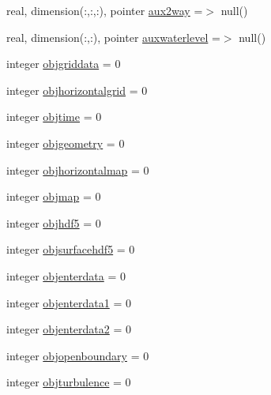 \begin{DoxyCompactItemize}
\item 
real, dimension(\+:,\+:,\+:), pointer \mbox{\hyperlink{structmodulehydrodynamic_1_1t__hydrodynamic_a261d973b7c45e59f818d8c0c96ba4cfd}{aux2way}} =$>$ null()
\item 
real, dimension(\+:,\+:), pointer \mbox{\hyperlink{structmodulehydrodynamic_1_1t__hydrodynamic_ad58ea9575b05bcac20f10f2f668dfc9a}{auxwaterlevel}} =$>$ null()
\item 
integer \mbox{\hyperlink{structmodulehydrodynamic_1_1t__hydrodynamic_a3fd670025e0afe6b14388bcb5bddb083}{objgriddata}} = 0
\item 
integer \mbox{\hyperlink{structmodulehydrodynamic_1_1t__hydrodynamic_afa271d67fc223227e43d36adda3f5a8d}{objhorizontalgrid}} = 0
\item 
integer \mbox{\hyperlink{structmodulehydrodynamic_1_1t__hydrodynamic_aac2b5de34c4ef0ddc8073d7f1b496823}{objtime}} = 0
\item 
integer \mbox{\hyperlink{structmodulehydrodynamic_1_1t__hydrodynamic_ad826fa2d6067e5aed953ed069f305183}{objgeometry}} = 0
\item 
integer \mbox{\hyperlink{structmodulehydrodynamic_1_1t__hydrodynamic_abadfd6ebb7408637d3e7d5a0a5b15725}{objhorizontalmap}} = 0
\item 
integer \mbox{\hyperlink{structmodulehydrodynamic_1_1t__hydrodynamic_aaf40e46aa5f8d92c486cac54d61c9053}{objmap}} = 0
\item 
integer \mbox{\hyperlink{structmodulehydrodynamic_1_1t__hydrodynamic_ab3f0fd5f53f934e1b6368346f100d9f3}{objhdf5}} = 0
\item 
integer \mbox{\hyperlink{structmodulehydrodynamic_1_1t__hydrodynamic_afd1269d9aea358e9e09c999726554caa}{objsurfacehdf5}} = 0
\item 
integer \mbox{\hyperlink{structmodulehydrodynamic_1_1t__hydrodynamic_acbc668172a4727f4af7e050d3d372741}{objenterdata}} = 0
\item 
integer \mbox{\hyperlink{structmodulehydrodynamic_1_1t__hydrodynamic_a7b084c69b32ba2d8c2179595d9c6f22d}{objenterdata1}} = 0
\item 
integer \mbox{\hyperlink{structmodulehydrodynamic_1_1t__hydrodynamic_a09adc9c8ba928cf4b3f36ef587f97e9a}{objenterdata2}} = 0
\item 
integer \mbox{\hyperlink{structmodulehydrodynamic_1_1t__hydrodynamic_a3dd8fe77003f204792ec567e1b34f1ad}{objopenboundary}} = 0
\item 
integer \mbox{\hyperlink{structmodulehydrodynamic_1_1t__hydrodynamic_aeeee9139efd7ee32534d95ec3699da41}{objturbulence}} = 0

\end{DoxyCompactItemize}
